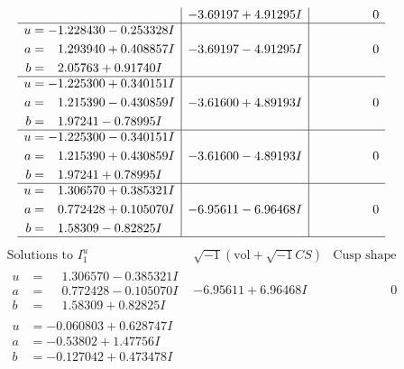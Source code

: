 \documentclass[1p]{elsarticle_modified}
\theoremstyle{definition}
\newcommand{\I}{\sqrt{-1}}
\begin{document}
$$\begin{array}{c|c|c}
 & -3.69197 + 4.91295 I & \phantom{-0.000000 } 0 \\ \hline\begin{aligned}
u &= -1.228430 - 0.253328 I \\
a &= \phantom{-}1.293940 + 0.408857 I \\
b &= \phantom{-}2.05763 + 0.91740 I\end{aligned}
 & -3.69197 - 4.91295 I & \phantom{-0.000000 } 0 \\ \hline\begin{aligned}
u &= -1.225300 + 0.340151 I \\
a &= \phantom{-}1.215390 - 0.430859 I \\
b &= \phantom{-}1.97241 - 0.78995 I\end{aligned}
 & -3.61600 + 4.89193 I & \phantom{-0.000000 } 0 \\ \hline\begin{aligned}
u &= -1.225300 - 0.340151 I \\
a &= \phantom{-}1.215390 + 0.430859 I \\
b &= \phantom{-}1.97241 + 0.78995 I\end{aligned}
 & -3.61600 - 4.89193 I & \phantom{-0.000000 } 0 \\ \hline\begin{aligned}
u &= \phantom{-}1.306570 + 0.385321 I \\
a &= \phantom{-}0.772428 + 0.105070 I \\
b &= \phantom{-}1.58309 - 0.82825 I\end{aligned}
 & -6.95611 - 6.96468 I & \phantom{-0.000000 } 0\\
 \hline 
 \end{array}$$\newpage$$\begin{array}{c|c|c}  
\text{Solutions to }I^u_{1}& \I (\text{vol} + \sqrt{-1}CS) & \text{Cusp shape}\\
 \hline 
\begin{aligned}
u &= \phantom{-}1.306570 - 0.385321 I \\
a &= \phantom{-}0.772428 - 0.105070 I \\
b &= \phantom{-}1.58309 + 0.82825 I\end{aligned}
 & -6.95611 + 6.96468 I & \phantom{-0.000000 } 0 \\ \hline\begin{aligned}
u &= -0.060803 + 0.628747 I \\
a &= -0.53802 + 1.47756 I \\
b &= -0.127042 + 0.473478 I\end{aligned}

\end{array}$$
\end{document}
